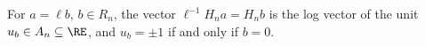 For $a=\ell b$, $b\in R_n$, the vector $\ell^{-1}H_na=H_nb$ is the log vector of the unit $u_b\in A_n\subseteq\RE$, and $u_b=\pm1$ if and only if $b=0$.
